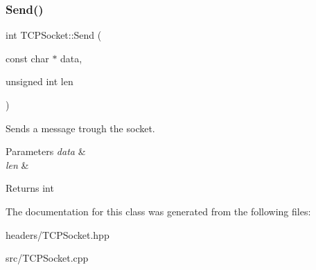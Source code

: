 \subsubsection{\texorpdfstring{Send()}{Send()}}
{\footnotesize\ttfamily int T\+C\+P\+Socket\+::\+Send (\begin{DoxyParamCaption}\item[{const char $\ast$}]{data,  }\item[{unsigned int}]{len }\end{DoxyParamCaption})}



Sends a message trough the socket. 


\begin{DoxyParams}{Parameters}
{\em data} & \\
\hline
{\em len} & \\
\hline
\end{DoxyParams}
\begin{DoxyReturn}{Returns}
int 
\end{DoxyReturn}


The documentation for this class was generated from the following files\+:\begin{DoxyCompactItemize}
\item 
headers/T\+C\+P\+Socket.\+hpp\item 
src/T\+C\+P\+Socket.\+cpp\end{DoxyCompactItemize}
